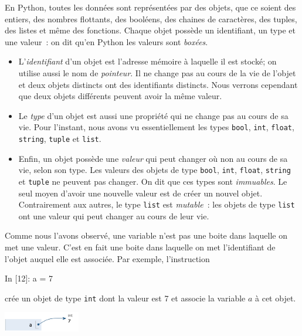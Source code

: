 \documentclass{magnolia}
\begin{document}
En Python, toutes les données sont représentées par des objets, que ce soient des entiers, des nombres
flottants, des booléens, des chaines de caractères, des tuples, des listes et même des fonctions. Chaque
objet possède un identifiant, un type et une valeur~: on dit qu'en Python les valeurs sont \emph{boxées}.
\begin{itemize}
\item L'\emph{identifiant} d'un objet est l'adresse mémoire à laquelle il est stocké; on utilise aussi
  le nom de \emph{pointeur}. Il ne change pas au cours de la vie de l'objet et deux objets
  distincts ont des identifiants distincts. Nous verrons cependant que deux objets différents peuvent
  avoir la même valeur.
\item Le \emph{type} d'un objet est aussi une propriété qui ne change pas au cours de sa vie. Pour l'instant, nous
  avons vu essentiellement les types \verb!bool!, \verb!int!, \verb!float!, \verb!string!, \verb!tuple! et \verb!list!.
\item Enfin, un objet possède une \emph{valeur} qui peut changer où non au cours de sa vie, selon son type.
  Les valeurs des objets de type \verb_bool_, \verb_int_, \verb_float_, \verb_string_ et \verb!tuple! ne peuvent
  pas changer. On dit que ces types sont \emph{immuables}. Le seul moyen d'avoir une nouvelle valeur est de
  créer un nouvel objet. Contrairement aux autres, le type \verb!list! est \emph{mutable}~: les objets
  de type \verb!list! ont une valeur qui peut changer au cours de leur vie.
\end{itemize}

\vspace{2ex}
Comme nous l'avons observé, une variable n'est pas une boite dans laquelle on met une valeur.
C'est en fait une boite dans laquelle on met l'identifiant de l'objet auquel elle est associée. Par exemple,
l'instruction

\begin{pythoncode}
In [12]: a = 7
\end{pythoncode} 
\noindent
crée un objet de type \verb_int_ dont la valeur est 7 et associe la variable $a$ à cet objet.

\begin{center}
\includegraphics[width=0.25\textwidth]{../../Commun/Images/python-cours-tutor-1}
\end{center}
\end{document}
